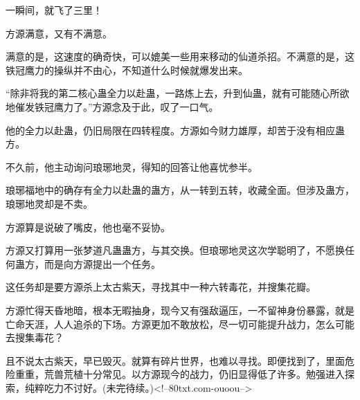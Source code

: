 \begin{this_body}
一瞬间，就飞了三里！

方源满意，又有不满意。

满意的是，这速度的确奇快，可以媲美一些用来移动的仙道杀招。不满意的是，这铁冠鹰力的操纵并不由心，不知道什么时候就爆发出来。

“除非将我的第二核心蛊全力以赴蛊，一路炼上去，升到仙蛊，就有可能随心所欲地催发铁冠鹰力了。”方源念及于此，叹了一口气。

他的全力以赴蛊，仍旧局限在四转程度。方源如今财力雄厚，却苦于没有相应蛊方。

不久前，他主动询问琅琊地灵，得知的回答让他喜忧参半。

琅琊福地中的确存有全力以赴蛊的蛊方，从一转到五转，收藏全面。但涉及蛊方，琅琊地灵却是不卖。

方源算是说破了嘴皮，他也毫不妥协。

方源又打算用一张梦道凡蛊蛊方，与其交换。但琅琊地灵这次学聪明了，不愿换任何蛊方，而是向方源提出一个任务。

这任务却是要方源杀上太古紫天，寻找其中一种六转毒花，并搜集花瓣。

方源忙得天昏地暗，根本无暇抽身，现今又有强敌逼压，一不留神身份暴露，就是亡命天涯，人人追杀的下场。方源更加不敢放松，尽一切可能提升战力，怎么可能去搜集毒花？

且不说太古紫天，早已毁灭。就算有碎片世界，也难以寻找。即便找到了，里面危险重重，荒兽荒植十分常见。以方源现今的战力，仍旧显得低了许多。勉强进入探索，纯粹吃力不讨好。(未完待续。)<!--80txt.com-ouoou-->

\end{this_body}


